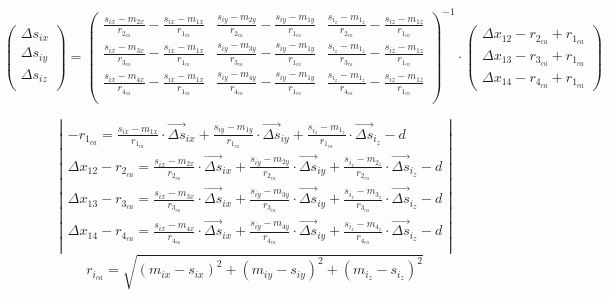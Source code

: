 $$
\begin{pmatrix}
{\Delta{s}}_{ix} \\
{\Delta{s}}_{iy} \\
{\Delta{s}}_{iz} \\
\end{pmatrix}
=
{\begin{pmatrix}
\frac{s_{ix} - m_{2x}}{r_{2_{ca}}} - \frac{s_{ix} - m_{1x}}{r_{1_{ca}}} & \frac{s_{iy} - m_{2y}}{r_{2_{ca}}} - \frac{s_{iy} - m_{1y}}{r_{1_{ca}}} & \frac{s_{i_z} - m_{1_z}}{r_{2_{ca}}} - \frac{s_{iz} - m_{1z}}{r_{1_{ca}}} \\
\frac{s_{ix} - m_{3x}}{r_{3_{ca}}} - \frac{s_{ix} - m_{1x}}{r_{1_{ca}}} & \frac{s_{iy} - m_{3y}}{r_{3_{ca}}} - \frac{s_{iy} - m_{1y}}{r_{1_{ca}}} & \frac{s_{i_z} - m_{1_z}}{r_{3_{ca}}} - \frac{s_{iz} - m_{1z}}{r_{1_{ca}}} \\
\frac{s_{ix} - m_{4x}}{r_{4_{ca}}} - \frac{s_{ix} - m_{1x}}{r_{1_{ca}}} & \frac{s_{iy} - m_{4y}}{r_{4_{ca}}} - \frac{s_{iy} - m_{1y}}{r_{1_{ca}}} & \frac{s_{i_z} - m_{1_z}}{r_{4_{ca}}} - \frac{s_{iz} - m_{1z}}{r_{1_{ca}}} \\
\end{pmatrix}}^{-1}
\cdot
\begin{pmatrix}
\Delta{x_{12}} - r_{2_{ca}} + r_{1_{ca}}\\
\Delta{x_{13}} - r_{3_{ca}} + r_{1_{ca}}\\
\Delta{x_{14}} - r_{4_{ca}} + r_{1_{ca}}
\end{pmatrix}
$$

\iffalse
$$\left|\begin{array}{c}
-r_{1_{ca}} = \frac{s_{ix} - m_{1x}}{r_{1_{ca}}} \cdot \vec{\Delta{s}}_{ix} + \frac{s_{iy} - m_{1y}}{r_{1_{ca}}} \cdot \vec{\Delta{s}}_{iy} + \frac{s_{i_z} - m_{1_z}}{r_{1_{ca}}} \cdot \vec{\Delta{s}}_{i_z} - d \\
\Delta{x_{12}} - r_{2_{ca}} = \frac{s_{ix} - m_{2x}}{r_{2_{ca}}} \cdot \vec{\Delta{s}}_{ix} + \frac{s_{iy} - m_{2y}}{r_{2_{ca}}} \cdot \vec{\Delta{s}}_{iy} + \frac{s_{i_z} - m_{2_z}}{r_{2_{ca}}} \cdot \vec{\Delta{s}}_{i_z} - d \\
\Delta{x_{13}} - r_{3_{ca}} = \frac{s_{ix} - m_{3x}}{r_{3_{ca}}} \cdot \vec{\Delta{s}}_{ix} + \frac{s_{iy} - m_{3y}}{r_{3_{ca}}} \cdot \vec{\Delta{s}}_{iy} + \frac{s_{i_z} - m_{3_z}}{r_{3_{ca}}} \cdot \vec{\Delta{s}}_{i_z} - d \\
\Delta{x_{14}} - r_{4_{ca}} = \frac{s_{ix} - m_{4x}}{r_{4_{ca}}} \cdot \vec{\Delta{s}}_{ix} + \frac{s_{iy} - m_{4y}}{r_{4_{ca}}} \cdot \vec{\Delta{s}}_{iy} + \frac{s_{i_z} - m_{4_z}}{r_{4_{ca}}} \cdot \vec{\Delta{s}}_{i_z} - d \\
\end{array}\right|$$
$$r_{i_{ca}} = \sqrt{(m_{ix} - s_{ix})^2 + (m_{iy} - s_{iy})^2 + (m_{i_z} - s_{i_z})^2}$$

